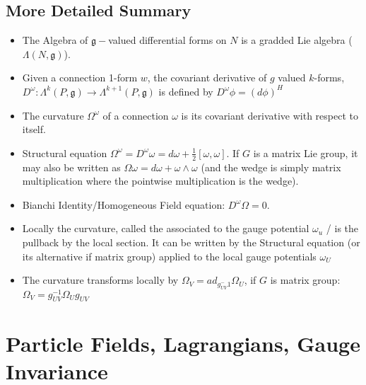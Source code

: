 \documentclass[12pt]{report}
\begin{document}
\section{More Detailed Summary}

\begin{itemize}
    \item The Algebra of $\mathfrak g-$valued differential forms on $N$ is a gradded Lie algebra ($\Lambda(N, \mathfrak g)$).
    
    \item Given a connection 1-form $w$, the covariant derivative of $g$ valued $k$-forms, $D^\omega: \Lambda^k(P, \mathfrak g) \to \Lambda^{k+1}(P, \mathfrak g)$ is defined by $D^\omega \phi = (d\phi)^H$
    
    \item The curvature $\Omega^\omega$ of a connection $\omega$ is its covariant derivative with respect to itself.
    
    \item Structural equation $\Omega^\omega = D^\omega \omega = d\omega + \frac{1}{2}[\omega, \omega]$. If $G$ is a matrix Lie group, it may also be written as $\Omega\omega = d\omega + \omega \wedge \omega$ (and the wedge is simply matrix multiplication where the pointwise multiplication is the wedge).
    
    \item Bianchi Identity/Homogeneous Field equation: $D^\omega \Omega = 0$.
    
    \item Locally the curvature, called the  associated to the gauge potential $\omega_u$ /  is the pullback by the local section. It can be written by the Structural equation (or its alternative if matrix group) applied to the local gauge potentials $\omega_U$
    
    \item The curvature transforms locally by $\Omega_V = ad_{g_{UV}^-1} \Omega_U$, if $G$ is matrix group: $\Omega_V = g^{-1}_{UV}\Omega_U g_{UV}$
    
\end{itemize}


\chapter{Particle Fields, Lagrangians, Gauge Invariance}
\end{document}
